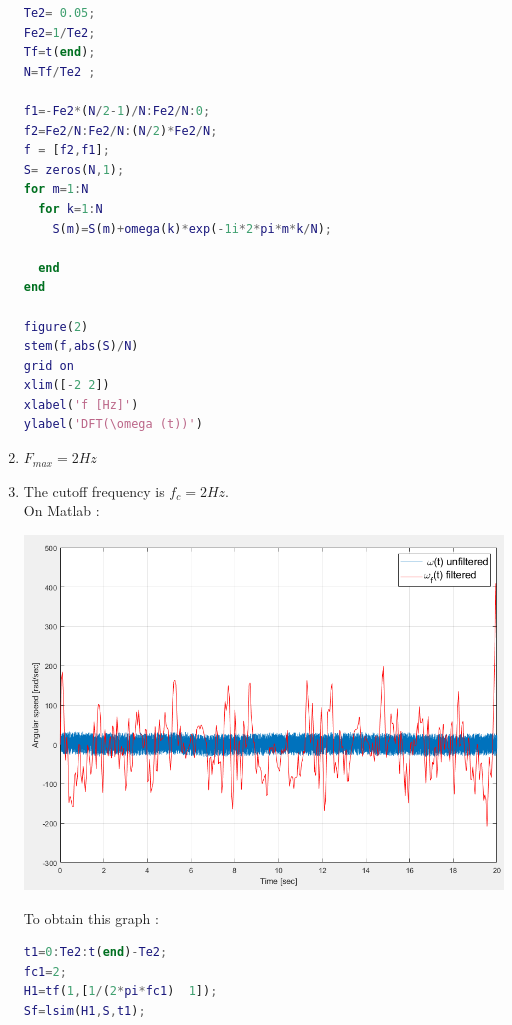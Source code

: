 \documentclass[a4paper,12pt]{article}
\begin{document}
\begin{enumerate}[label={\color{blue}\arabic*)}]
\begin{multicols}{2}
    \begin{lstlisting}[style=Matlab-editor,language=Matlab, basicstyle=\small\ttfamily]
% Plot of the DFT of omega(t)
Te2= 0.05;
Fe2=1/Te2;
Tf=t(end);
N=Tf/Te2 ;

f1=-Fe2*(N/2-1)/N:Fe2/N:0;
f2=Fe2/N:Fe2/N:(N/2)*Fe2/N;
f = [f2,f1];
S= zeros(N,1);
for m=1:N
  for k=1:N
    S(m)=S(m)+omega(k)*exp(-1i*2*pi*m*k/N);

  end
end

figure(2)
stem(f,abs(S)/N)
grid on
xlim([-2 2])
xlabel('f [Hz]')
ylabel('DFT(\omega (t))')
        \end{lstlisting}

    \end{multicols}

    \item
    \(F_{max} = 2 Hz\)
    \newpage

    \item
    The cutoff frequency is \(f_c = 2 Hz\). \\
    On Matlab :
    \begin{multicols}{2}

        \begin{flushleft}
            \includegraphics[scale=0.35]{Images/Omega_Filtered.png}
            \label{Figure3}
        \end{flushleft}

    \columnbreak

    To obtain this graph :

    \begin{lstlisting}[style=Matlab-editor,language=Matlab, basicstyle=\small\ttfamily]
    % filter design
t1=0:Te2:t(end)-Te2;
fc1=2;
H1=tf(1,[1/(2*pi*fc1)  1]);
Sf=lsim(H1,S,t1);


\end{lstlisting}
\end{multicols}
\end{enumerate}
\end{document}
